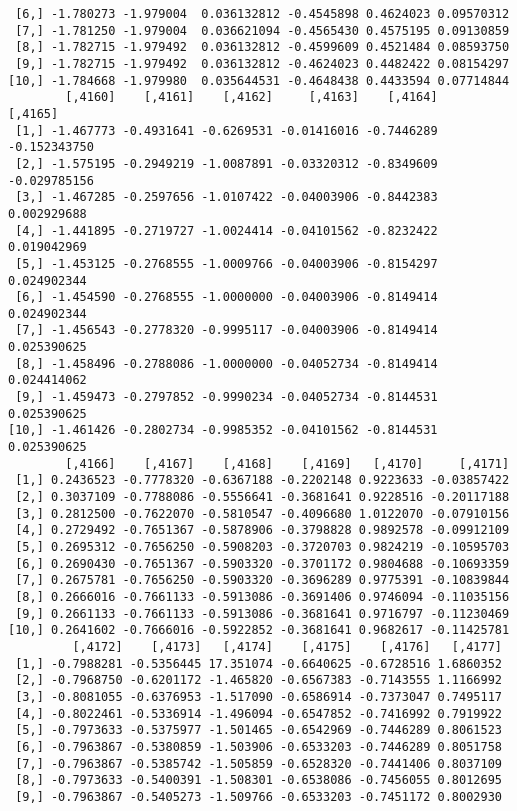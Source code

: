 \documentclass[
  letterpaper,
  DIV=11,
  numbers=noendperiod]{scrreprt}
\begin{document}
\begin{verbatim}
 [6,] -1.780273 -1.979004  0.036132812 -0.4545898 0.4624023 0.09570312
 [7,] -1.781250 -1.979004  0.036621094 -0.4565430 0.4575195 0.09130859
 [8,] -1.782715 -1.979492  0.036132812 -0.4599609 0.4521484 0.08593750
 [9,] -1.782715 -1.979492  0.036132812 -0.4624023 0.4482422 0.08154297
[10,] -1.784668 -1.979980  0.035644531 -0.4648438 0.4433594 0.07714844
        [,4160]    [,4161]    [,4162]     [,4163]    [,4164]      [,4165]
 [1,] -1.467773 -0.4931641 -0.6269531 -0.01416016 -0.7446289 -0.152343750
 [2,] -1.575195 -0.2949219 -1.0087891 -0.03320312 -0.8349609 -0.029785156
 [3,] -1.467285 -0.2597656 -1.0107422 -0.04003906 -0.8442383  0.002929688
 [4,] -1.441895 -0.2719727 -1.0024414 -0.04101562 -0.8232422  0.019042969
 [5,] -1.453125 -0.2768555 -1.0009766 -0.04003906 -0.8154297  0.024902344
 [6,] -1.454590 -0.2768555 -1.0000000 -0.04003906 -0.8149414  0.024902344
 [7,] -1.456543 -0.2778320 -0.9995117 -0.04003906 -0.8149414  0.025390625
 [8,] -1.458496 -0.2788086 -1.0000000 -0.04052734 -0.8149414  0.024414062
 [9,] -1.459473 -0.2797852 -0.9990234 -0.04052734 -0.8144531  0.025390625
[10,] -1.461426 -0.2802734 -0.9985352 -0.04101562 -0.8144531  0.025390625
        [,4166]    [,4167]    [,4168]    [,4169]   [,4170]     [,4171]
 [1,] 0.2436523 -0.7778320 -0.6367188 -0.2202148 0.9223633 -0.03857422
 [2,] 0.3037109 -0.7788086 -0.5556641 -0.3681641 0.9228516 -0.20117188
 [3,] 0.2812500 -0.7622070 -0.5810547 -0.4096680 1.0122070 -0.07910156
 [4,] 0.2729492 -0.7651367 -0.5878906 -0.3798828 0.9892578 -0.09912109
 [5,] 0.2695312 -0.7656250 -0.5908203 -0.3720703 0.9824219 -0.10595703
 [6,] 0.2690430 -0.7651367 -0.5903320 -0.3701172 0.9804688 -0.10693359
 [7,] 0.2675781 -0.7656250 -0.5903320 -0.3696289 0.9775391 -0.10839844
 [8,] 0.2666016 -0.7661133 -0.5913086 -0.3691406 0.9746094 -0.11035156
 [9,] 0.2661133 -0.7661133 -0.5913086 -0.3681641 0.9716797 -0.11230469
[10,] 0.2641602 -0.7666016 -0.5922852 -0.3681641 0.9682617 -0.11425781
         [,4172]    [,4173]   [,4174]    [,4175]    [,4176]   [,4177]
 [1,] -0.7988281 -0.5356445 17.351074 -0.6640625 -0.6728516 1.6860352
 [2,] -0.7968750 -0.6201172 -1.465820 -0.6567383 -0.7143555 1.1166992
 [3,] -0.8081055 -0.6376953 -1.517090 -0.6586914 -0.7373047 0.7495117
 [4,] -0.8022461 -0.5336914 -1.496094 -0.6547852 -0.7416992 0.7919922
 [5,] -0.7973633 -0.5375977 -1.501465 -0.6542969 -0.7446289 0.8061523
 [6,] -0.7963867 -0.5380859 -1.503906 -0.6533203 -0.7446289 0.8051758
 [7,] -0.7963867 -0.5385742 -1.505859 -0.6528320 -0.7441406 0.8037109
 [8,] -0.7973633 -0.5400391 -1.508301 -0.6538086 -0.7456055 0.8012695
 [9,] -0.7963867 -0.5405273 -1.509766 -0.6533203 -0.7451172 0.8002930

\end{verbatim}
\end{document}
